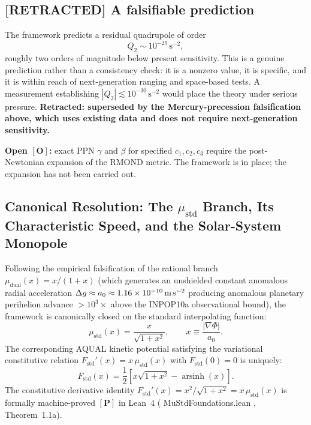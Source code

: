 \documentclass[aps,prd,preprint,superscriptaddress,nofootinbib,amsmath,amssymb,floatfix]{revtex4-2}
\makeatletter
\DeclareRobustCommand{\rntexttt}[1]{%
  \ifmmode
    \nfss@text{\ttfamily\hyphenchar\font=-1 #1}%
  \else
    \hmode@bgroup\ttfamily\hyphenchar\font=-1 #1\egroup
  \fi}
\DeclareRobustCommand{\_}{%
    \ifmmode\nfss@text{\textunderscore}\else\textunderscore\penalty\z@\fi}%
\let\texttt\rntexttt
\makeatother
\begin{document}
\subsection*{[RETRACTED] A falsifiable prediction}

The framework predicts a residual quadrupole of order
\begin{equation}
\label{eq:q2pred_orig}
Q_2 \sim 10^{-29}\,\text{s}^{-2},
\end{equation}
roughly two orders of magnitude below present sensitivity. This is a genuine prediction rather than a consistency check: it is a nonzero value, it is specific, and it is within reach of next-generation ranging and space-based tests. A measurement establishing $|Q_2| \lesssim 10^{-30}\,\text{s}^{-2}$ would place the theory under serious pressure. \textbf{Retracted: superseded by the Mercury-precession falsification above, which uses existing data and does not require next-generation sensitivity.}

\textbf{Open $\mathbf{[O]}$:} exact PPN $\gamma$ and $\beta$ for specified $c_1,c_2,c_3$ require the post-Newtonian expansion of the RMOND metric. The framework is in place; the expansion has not been carried out.

\subsection{Canonical Resolution: The $\mu_{\text{std}}$ Branch, Its Characteristic Speed, and the Solar-System Monopole}
\label{sec:mu_std_clearance}

Following the empirical falsification of the rational branch $\mu_{\text{dual}}(x) = x/(1+x)$ (which generates an unshielded constant anomalous radial acceleration $\Delta g \approx a_0 \approx 1.16 \times 10^{-10}\,\text{m\,s}^{-2}$ producing anomalous planetary perihelion advance $> 10^3\times$ above the INPOP10a observational bound), the framework is canonically closed on the standard interpolating function:
\begin{equation}
\label{eq:mu_std_canonical}
\mu_{\text{std}}(x) = \frac{x}{\sqrt{1 + x^2}}, \qquad x \equiv \frac{|\nabla\Phi|}{a_0}.
\end{equation}
The corresponding AQUAL kinetic potential satisfying the variational constitutive relation $F_{\text{std}}'(x) = x\,\mu_{\text{std}}(x)$ with $F_{\text{std}}(0) = 0$ is uniquely:
\begin{equation}
\label{eq:F_std_canonical}
F_{\text{std}}(x) = \frac{1}{2} \left[ x\sqrt{1 + x^2} - \operatorname{arsinh}(x) \right].
\end{equation}
The constitutive derivative identity $F_{\text{std}}'(x) = x^2/\sqrt{1+x^2} = x\,\mu_{\text{std}}(x)$ is formally machine-proved $\mathbf{[P]}$ in Lean~4 (\texttt{MuStdFoundations.lean}, Theorem~1.1a).
\end{document}
